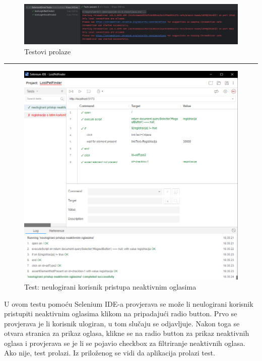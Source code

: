 \begin{figure}[!htb]
	\centering
	\includegraphics[width=\textwidth]{slike/test_passed.png}
	\caption{Testovi prolaze}
\end{figure}

\par\noindent\rule{\textwidth}{0.5pt}

\begin{figure}[!htb]
	\centering
	\includegraphics[width=\textwidth]{slike/selenium_test_1.png}
	\caption{Test: neulogirani korisnik pristupa neaktivnim oglasima}
\end{figure}

U ovom testu pomoću Selenium IDE-a provjerava se može li neulogirani korisnik pristupiti neaktivnim oglasima klikom na pripadajući radio button. Prvo se provjerava je li korisnik ulogiran, u tom slučaju se odjavljuje. Nakon toga se otvara stranica za prikaz oglasa, klikne se na radio button za prikaz neaktivnih oglasa i provjerava se je li se pojavio checkbox za filtriranje neaktivnih oglasa. Ako nije, test prolazi. Iz priloženog se vidi da aplikacija prolazi test.

